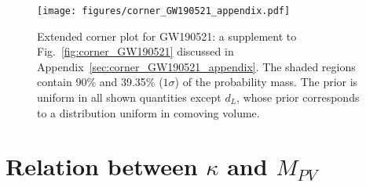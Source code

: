 \documentclass[aps,prd,twocolumn,superscriptaddress,preprintnumbers,floatfix,nofootinbib]{revtex4-2}
\begin{document}
\begin{figure*}[h]
    \texttt{[image: figures/corner\_GW190521\_appendix.pdf]}
    \caption{
        Extended corner plot for GW190521: a supplement to Fig.~\ref{fig:corner_GW190521} discussed in Appendix~\ref{sec:corner_GW190521_appendix}. The shaded regions contain 90\% and 39.35\% ($1\sigma$) of
 the probability mass.
        The prior is uniform in all shown quantities except $d_L$, whose prior corresponds to a distribution uniform in comoving volume.
    }
    \label{fig:corner_GW190521_appendix}
\end{figure*}

% 

% 

\section{Relation between $\kappa$ and $M_{PV}$}
\label{sec:M_PV_derivation}
\end{document}
